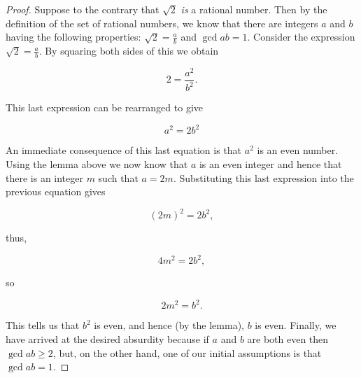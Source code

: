 \begin{proof}
Suppose to the contrary that $\sqrt{2}$ {\em is} a rational number.
Then by the definition of the set of rational numbers, we know that
there are integers 
$a$ and $b$ having the following properties: 
$\displaystyle \sqrt{2} = \frac{a}{b}$ and $\gcd{a}{b} = 1$.
Consider the expression $\displaystyle \sqrt{2} = \frac{a}{b}$.   
By squaring both sides of this we obtain

\[ 2 = \frac{a^2}{b^2}.
\]

This last expression can be rearranged to give

\begin{equation*}
a^2 = 2 b^2
\end{equation*}

An immediate consequence of this last equation is that $a^2$ is an
even number.
Using the lemma above we now know that $a$ is an even
integer and hence that there is an integer $m$ such that $a=2m$.
Substituting this last expression into the previous equation gives

\begin{equation*}
(2m)^2 = 2 b^2,
\end{equation*}

thus,

\begin{equation*}
4m^2 = 2 b^2,
\end{equation*}

so

\begin{equation*}
2m^2 = b^2.
\end{equation*}

This tells us that $b^2$ is even, and hence (by the lemma), $b$ is even.
Finally, we have arrived at the desired absurdity because if $a$ and
$b$ are both even then $\gcd{a}{b} \geq 2$, but, on the other hand,
one of our initial assumptions is that $\gcd{a}{b} = 1$.
\end{proof}

